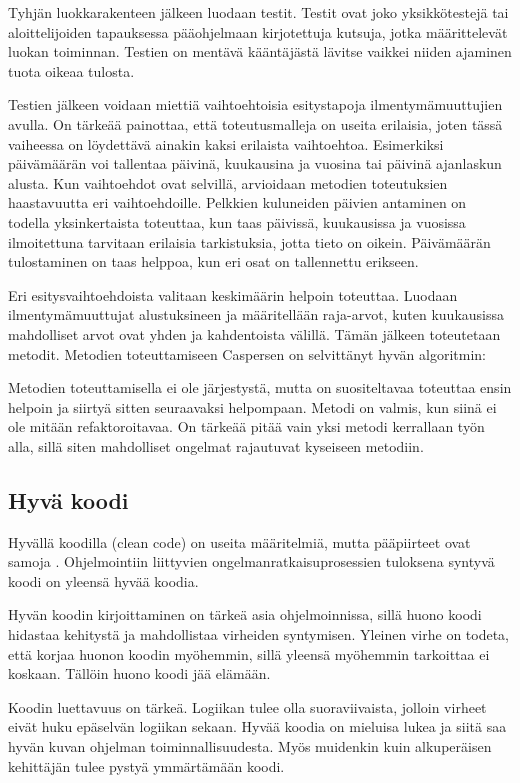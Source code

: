 Tyhjän luokkarakenteen jälkeen luodaan testit. Testit ovat joko yksikkötestejä
tai aloittelijoiden tapauksessa pääohjelmaan kirjotettuja kutsuja, jotka
määrittelevät luokan toiminnan. Testien on mentävä kääntäjästä lävitse vaikkei
niiden ajaminen tuota oikeaa tulosta.

Testien jälkeen voidaan miettiä vaihtoehtoisia esitystapoja ilmentymämuuttujien
avulla. On tärkeää painottaa, että toteutusmalleja on useita erilaisia, joten
tässä vaiheessa on löydettävä ainakin kaksi erilaista vaihtoehtoa. Esimerkiksi
päivämäärän voi tallentaa päivinä, kuukausina ja vuosina tai päivinä ajanlaskun
alusta. Kun vaihtoehdot ovat selvillä, arvioidaan metodien toteutuksien
haastavuutta eri vaihtoehdoille. Pelkkien kuluneiden päivien antaminen on
todella yksinkertaista toteuttaa, kun taas päivissä, kuukausissa ja vuosissa
ilmoitettuna tarvitaan erilaisia tarkistuksia, jotta tieto on oikein.
Päivämäärän tulostaminen on taas helppoa, kun eri osat on tallennettu erikseen.

Eri esitysvaihtoehdoista valitaan keskimäärin helpoin toteuttaa. Luodaan
ilmentymämuuttujat alustuksineen ja määritellään raja-arvot, kuten kuukausissa
mahdolliset arvot ovat yhden ja kahdentoista välillä. Tämän jälkeen toteutetaan
metodit. Metodien toteuttamiseen Caspersen on selvittänyt hyvän algoritmin:

Metodien toteuttamisella ei ole järjestystä, mutta on suositeltavaa toteuttaa
ensin helpoin ja siirtyä sitten seuraavaksi helpompaan. Metodi on valmis, kun
siinä ei ole mitään refaktoroitavaa. On tärkeää pitää vain yksi metodi
kerrallaan työn alla, sillä siten mahdolliset ongelmat rajautuvat kyseiseen
metodiin.

\subsection{Hyvä koodi}

Hyvällä koodilla (clean code) on useita määritelmiä, mutta pääpiirteet ovat
samoja \cite{Martin:2008:CCH:1388398}. Ohjelmointiin liittyvien
ongelmanratkaisuprosessien tuloksena syntyvä koodi on yleensä hyvää koodia.

Hyvän koodin kirjoittaminen on tärkeä asia ohjelmoinnissa, sillä huono koodi
hidastaa kehitystä ja mahdollistaa virheiden syntymisen. Yleinen virhe on
todeta, että korjaa huonon koodin myöhemmin, sillä yleensä myöhemmin tarkoittaa
ei koskaan. Tällöin huono koodi jää elämään.

Koodin luettavuus on tärkeä. Logiikan tulee olla suoraviivaista, jolloin virheet
eivät huku epäselvän logiikan sekaan. Hyvää koodia on mieluisa lukea ja siitä
saa hyvän kuvan ohjelman toiminnallisuudesta. Myös muidenkin kuin alkuperäisen
kehittäjän tulee pystyä ymmärtämään koodi.

